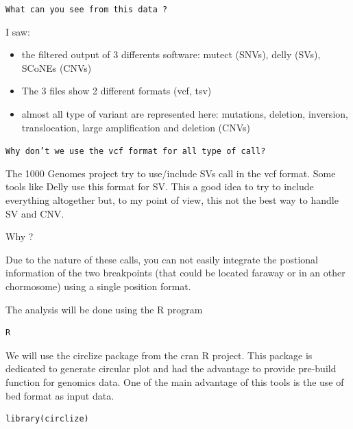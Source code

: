 \begin{questions}
\texttt{What can you see from this data ?}
\end{questions}


\begin{answer}
I saw:
\begin{itemize}
  \item the filtered output of 3 differents software: mutect (SNVs), delly (SVs), SCoNEs (CNVs)
  \item The 3 files show 2 different formats (vcf, tsv)
  \item almost all type of variant are represented here: mutations, deletion, inversion, translocation, large amplification and deletion (CNVs)
\end{itemize}
\end{answer}




\begin{questions}
\texttt{Why don't we use the vcf format for all type of call?}
\end{questions}


\begin{answer}
The 1000 Genomes project try to use/include SVs call in the vcf format. Some tools like Delly use this format for SV. This a good idea to try to include everything altogether but, to my point of view, this not the best way to handle SV and CNV. 

Why ?

Due to the nature of these calls, you can not easily integrate the postional information of the two breakpoints (that could be located faraway or in an other chormosome) using a single position format.
\end{answer}



The analysis will be done using the R program

\begin{steps}
\begin{lstlisting}
R
\end{lstlisting}
\end{steps}

We will use the circlize package from the cran R project. This package is dedicated to generate circular plot and had the advantage to provide pre-build function for genomics data. One of the main advantage of this tools is the use of bed format as input data.

\begin{steps}
\begin{lstlisting}
library(circlize)
\end{lstlisting}
\end{steps}


